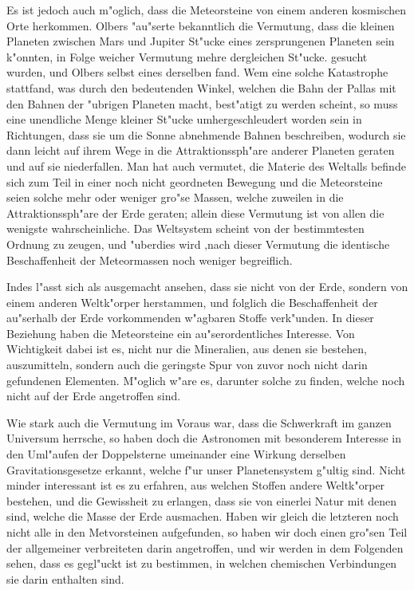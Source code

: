 \documentclass[a4paper, 11pt, oneside]{article}
\begin{document}
Es ist jedoch auch m"oglich, dass die Meteorsteine von einem anderen kosmischen Orte herkommen. Olbers "au"serte bekanntlich die Vermutung, dass die kleinen Planeten zwischen Mars und Jupiter St"ucke eines zersprungenen Planeten sein k"onnten, in Folge weicher Vermutung mehre dergleichen St"ucke. gesucht wurden, und Olbers selbst eines derselben fand. Wem eine solche Katastrophe stattfand, was durch den bedeutenden Winkel, welchen die Bahn der Pallas mit den Bahnen der "ubrigen Planeten macht, best"atigt zu werden scheint, so muss eine unendliche Menge kleiner St"ucke umhergeschleudert worden sein in Richtungen, dass sie um die Sonne abnehmende Bahnen beschreiben, wodurch sie dann leicht auf ihrem Wege in die Attraktionssph"are anderer Planeten geraten und auf sie niederfallen. Man hat auch vermutet, die Materie des Weltalls befinde sich zum Teil in einer noch nicht geordneten Bewegung und die Meteorsteine seien solche mehr oder weniger gro"se Massen‚ welche zuweilen in die Attraktionssph"are der Erde geraten; allein diese Vermutung ist von allen die wenigste wahrscheinliche. Das Weltsystem scheint von der bestimmtesten Ordnung zu zeugen, und "uberdies wird ‚nach dieser Vermutung die identische Beschaffenheit der Meteormassen noch weniger begreiflich.

Indes l"asst sich als ausgemacht ansehen, dass sie nicht von der Erde, sondern von einem anderen Weltk"orper herstammen, und folglich die Beschaffenheit der au"serhalb der Erde vorkommenden w"agbaren Stoffe verk"unden. In dieser Beziehung haben die Meteorsteine ein au"serordentliches Interesse. Von Wichtigkeit dabei ist es, nicht nur die Mineralien, aus denen sie bestehen, auszumitteln, sondern auch die geringste Spur von zuvor noch nicht darin gefundenen Elementen. M"oglich w"are es, darunter solche zu finden, welche noch nicht auf der Erde angetroffen sind.

Wie stark auch die Vermutung im Voraus war, dass die Schwerkraft im ganzen Universum herrsche, so haben doch die Astronomen mit besonderem Interesse in den Uml"aufen der Doppelsterne umeinander eine Wirkung derselben Gravitationsgesetze erkannt, welche f"ur unser Planetensystem g"ultig sind. Nicht minder interessant ist es zu erfahren, aus welchen Stoffen andere Weltk"orper bestehen, und die Gewissheit zu erlangen, dass sie von einerlei Natur mit denen sind, welche die Masse der Erde ausmachen. Haben wir gleich die letzteren noch nicht alle in den Metvorsteinen aufgefunden, so haben wir doch einen gro"sen Teil der allgemeiner verbreiteten darin angetroffen, und wir werden in dem Folgenden sehen, dass es gegl"uckt ist zu bestimmen, in welchen chemischen Verbindungen sie darin enthalten sind.
\end{document}
